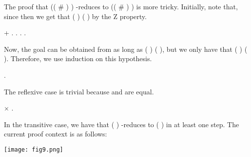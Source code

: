 The proof that (( \# ) ) -reduces to (( \# ) ) is more tricky. Initially, note that, since    then we get that   ( ) ( ) by the Z property. \begin{coqdoccode}
\coqdocemptyline
\coqdocindent{2.00em}
+    .  .   .  .\coqdoceol
\coqdocemptyline
\end{coqdoccode}
Now, the goal can be obtained from  as long as  ( ) ( ), but we only have that   ( ) ( ). Therefore, we use induction on this hypothesis. \begin{coqdoccode}
\coqdocemptyline
\coqdocindent{3.00em}
 .\coqdoceol
\coqdocemptyline
\end{coqdoccode}
The reflexive case is trivial because  and  are equal.  \begin{coqdoccode}
\coqdocemptyline
\coqdocindent{3.00em}
\ensuremath{\times}  .\coqdoceol
\coqdocemptyline
\end{coqdoccode}
In the transitive case, we have that ( ) -reduces to ( ) in at least one step. The current proof context is as follows:


      \texttt{[image: fig9.png]}


